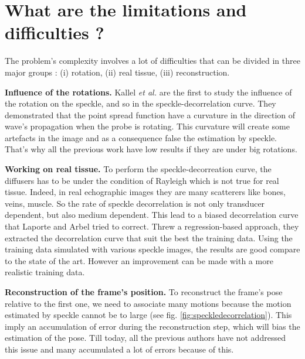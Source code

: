\documentclass[runningheads,a4paper]{llncs}
\begin{document}
\section{What are the limitations and difficulties ?}
The problem's complexity involves a lot of difficulties that can be divided in three major groups : (i) rotation, (ii) real tissue, (iii) reconstruction.\par
\textbf{Influence of the rotations.} Kallel \textit{et al.} \cite{kallel1994speckle} are the first to study the influence of the rotation on the speckle, and so in the speckle-decorrelation curve. They demonstrated that the point spread function have a curvature in the direction of wave's propagation when the probe is rotating. This curvature will create some artefacts in the image and as a consequence false the estimation by speckle. That's why all the previous work have low results if they are under big rotations.\par
\textbf{Working on real tissue.} To perform the speckle-decorreation curve, the diffusers has to be under the condition of Rayleigh which is not true for real tissue. Indeed, in real echographic images they are many scatterers like bones, veins, muscle. So the rate of speckle decorrelation is not only transducer dependent, but also medium dependent. This lead to a biased decorrelation curve that Laporte and Arbel \cite{laporte2011learning} tried to correct. Threw a regression-based approach, they extracted the decorrelation curve that suit the best the training data. Using the training data simulated with various speckle images, the results are good compare to the state of the art. However an improvement can be made with a more realistic training data. \par
\textbf{Reconstruction of the frame's position.} To reconstruct the frame's pose relative to the first one, we need to associate many motions because the motion estimated by speckle cannot be to large (see fig. \ref{fig:speckledecorrelation}). This imply an accumulation of error during the reconstruction step, which will bias the estimation of the pose. Till today, all the previous authors have not addressed this issue and many accumulated a lot of errors because of this.
\end{document}
